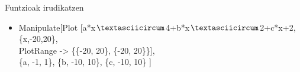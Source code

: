 \documentclass[xcolor=x11names,table]{beamer}
\begin{document}
\begin{frame}{Funtzioak irudikatzen}
\begin{itemize}
		\item<1-> Manipulate[Plot [a*x$\textasciicircum$4+b*x$\textasciicircum$2+c*x+2,\{x,-20,20\}, \\
 PlotRange -> \{\{-20, 20\}, \{-20, 20\}\}],\\
 \{a, -1, 1\}, \{b, -10, 10\}, \{c, -10, 10\} ] 
\end{itemize}
\vspace{-1.5cm}
\begin{center}
\end{center}

\end{frame}
\end{document}
